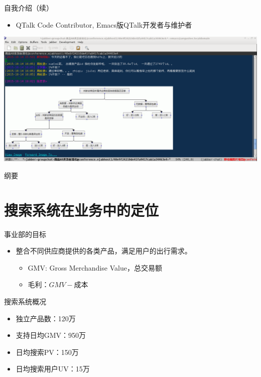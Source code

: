 \documentclass[handout]{beamer}
\begin{document}
\begin{CJK}{UTF8}{gbsn}
\begin{frame}{自我介绍（续）}
  \begin{itemize}
  \item {QTalk Code Contributor, Emacs版QTalk开发者与维护者}
  \end{itemize}
  \begin{center}
    \includegraphics[scale=0.3]{./images/qtalk-emacs-screenshot}
  \end{center}
\end{frame}

\begin{frame}{纲要}
  \tableofcontents
\end{frame}

\section{搜索系统在业务中的定位}


\begin{frame}{事业部的目标}
  \begin{itemize}
  \item { 整合不同供应商提供的各类产品，满足用户的出行需求。
    \begin{itemize}
      \item<2-> { GMV: Gross Merchandise Value，总交易额 }
      \item<2-> { 毛利：$GMV - \text{成本} $ }
    \end{itemize}
  }
  \end{itemize}
\end{frame}

\begin{frame}{搜索系统概况}
  \begin{itemize}
  \item { 独立产品数：120万 }
  \item { 支持日均GMV：950万 }
  \item { 日均搜索PV：150万 }
  \item { 日均搜索用户UV：15万 }
  \end{itemize}
\end{frame}



\end{CJK}
\end{document}
